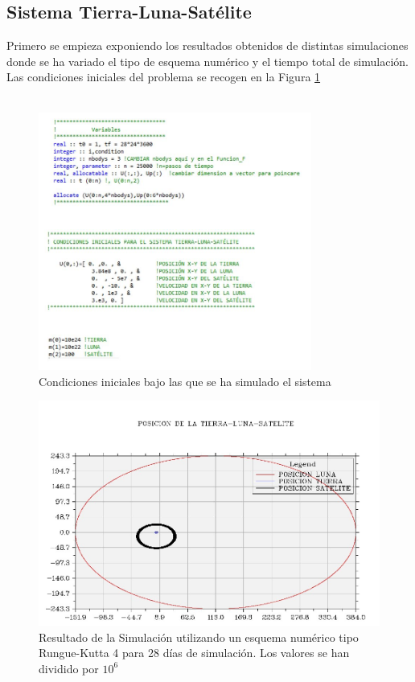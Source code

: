 \documentclass[11pt,singlespacing,liststotoc,headsepline,a4paper]{article}
\begin{document}
\subsection{Sistema Tierra-Luna-Satélite}

Primero se empieza exponiendo los resultados obtenidos de distintas simulaciones donde se ha variado el tipo de esquema numérico y el tiempo total de simulación. Las condiciones iniciales del problema se recogen en la Figura \ref{TLS_CI}\\
\\ 

\begin{figure}[H]
	\centering
	\includegraphics[width=0.8\textwidth]{TLS_CI.jpg}
	\caption{Condiciones iniciales bajo las que se ha simulado el sistema}
	\label{TLS_CI}
\end{figure}


\begin{figure}[H]
	\centering
	\includegraphics[width=1\textwidth]{TLS28D.jpg}
	\caption{Resultado de la Simulación utilizando un esquema numérico tipo Rungue-Kutta 4 para 28 días de simulación. Los valores se han dividido por $10^{6}$}
	\label{TLS28D_RG4}
\end{figure}
\end{document}
